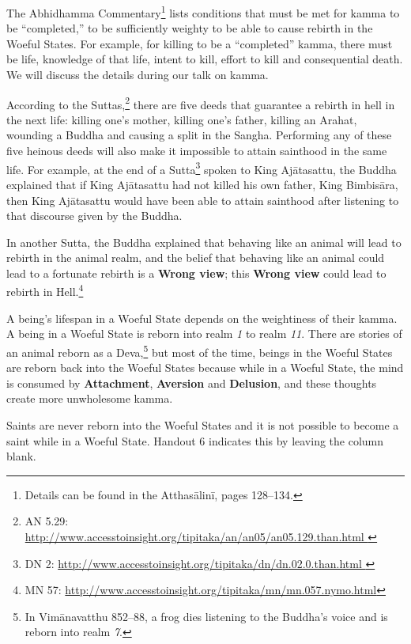 The Abhidhamma Commentary\footnote{Details can be found in the Atthasālinī, pages 128--134.} lists conditions that must be met for kamma to be “completed,” to be sufficiently weighty to be able to cause rebirth in the Woeful States. For example, for killing to be a “completed” kamma, there must be life, knowledge of that life, intent to kill, effort to kill and consequential death. We will discuss the details during our talk on kamma.

According to the Suttas,\footnote{AN 5.29: \url{http://www.accesstoinsight.org/tipitaka/an/an05/an05.129.than.html }} there are five deeds that guarantee a rebirth in hell in the next life: killing one’s mother, killing one’s father, killing an Arahat, wounding a Buddha and causing a split in the Sangha. Performing any of these five heinous deeds will also make it impossible to attain sainthood in the same life. For example, at the end of a Sutta\footnote{DN 2: \url{http://www.accesstoinsight.org/tipitaka/dn/dn.02.0.than.html }} spoken to King Ajātasattu, the Buddha explained that if King Ajātasattu had not killed his own father, King Bimbisāra, then King Ajātasattu would have been able to attain sainthood after listening to that discourse given by the Buddha.

In another Sutta, the Buddha explained that behaving like an animal will lead to rebirth in the animal realm, and the belief that behaving like an animal could lead to a fortunate rebirth is a \textbf{Wrong view}; this \textbf{Wrong view} could lead to rebirth in Hell.\footnote{MN 57: \url{http://www.accesstoinsight.org/tipitaka/mn/mn.057.nymo.html}}

A being’s lifespan in a Woeful State depends on the weightiness of their kamma. A being in a Woeful State is reborn into realm \textit{1} to realm \textit{11}. There are stories of an animal reborn as a Deva,\footnote{In Vimānavatthu 852--88, a frog dies listening to the Buddha’s voice and is reborn into realm \textit{7}.} but most of the time, beings in the Woeful States are reborn back into the Woeful States because while in a Woeful State, the mind is consumed by \textbf{Attachment}, \textbf{Aversion} and \textbf{Delusion}, and these thoughts create more unwholesome kamma.

Saints are never reborn into the Woeful States and it is not possible to become a saint while in a Woeful State. Handout 6 indicates this by leaving the column blank.

\pagebreak

